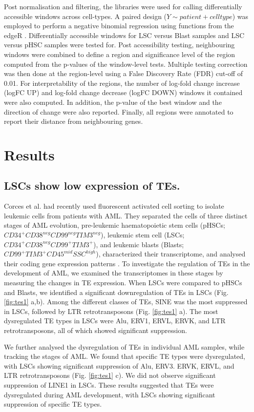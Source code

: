 Post normalisation and filtering, the libraries were used for calling differentially accessible windows across cell-types. A paired design ($Y \sim patient + cell type$) was employed to perform a negative binomial regression using functions from the edgeR \cite{Lun2016}. Differentially accessible windows for LSC versus Blast samples and LSC versus pHSC samples were tested for. Post accessibility testing, neighbouring windows were combined to define a region and significance level of the region computed from the p-values of the window-level tests. Multiple testing correction was then done at the region-level using a False Discovery Rate (FDR) cut-off of 0.01. For interpretability of the regions, the number of log-fold change increase (logFC UP) and log-fold change decrease (logFC DOWN) windows it contained were also computed. In addition, the p-value of the best window and the direction of change were also reported. Finally, all regions were annotated to report their distance from neighbouring genes.

\section{Results}

\subsection{LSCs show low expression of TEs.}
Corces et al. \cite{Corces2016} had recently used fluorescent activated cell sorting to isolate leukemic cells from patients with AML. They separated the cells of three distinct stages of AML evolution, pre-leukemic haematopoietic stem cells (pHSCs; $CD34^+CD38^{neg}CD99^{neg}TIM3^{neg}$), leukemic stem cell (LSCs; $CD34^+CD38^{neg}CD99^+TIM3^+$), and leukemic blasts (Blasts; $CD99^+TIM3^+CD45^{mid}SSC^{high}$), characterized their transcriptome, and analysed their coding gene expression patterns \cite{Corces2016}. To investigate the regulation of TEs in the development of AML, we examined the transcriptomes in these stages by measuring the changes in TE expression. When LSCs were compared to pHSCs and Blasts, we identified a significant downregulation of TEs in LSCs (Fig. \ref{fig:tes1} a,b). Among the different classes of TEs, SINE was the most suppressed in LSCs, followed by LTR retrotransposons (Fig. \ref{fig:tes1} a). The most dysregulated TE types in LSCs were Alu, ERV1, ERVL, ERVK, and LTR retrotransposons, all of which showed significant suppression.

We further analysed the dysregulation of TEs in individual AML samples, while tracking the stages of AML. We found that specific TE types were dysregulated, with LSCs showing significant suppression of Alu, ERV3. ERVK, ERVL, and LTR retrotransposons (Fig. \ref{fig:tes1} c). We did not observe significant suppression of LINE1 in LSCs. These results suggested that TEs were dysregulated during AML development, with LSCs showing significant suppression of specific TE types.


